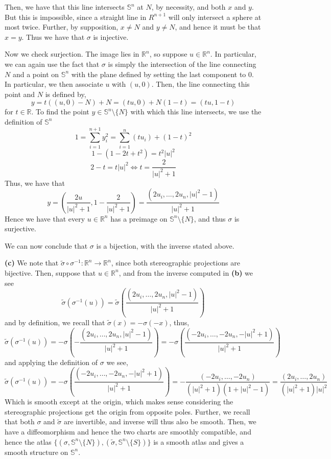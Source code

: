 \documentclass[10pt]{article}
\newcommand{\R}{\mathbb{R}}
\newcommand{\Sp}{\mathbb{S}}
\begin{document}
Then, we have that this line intersects $\Sp^{n}$ at $N$, by necessity, and both $x$ and $y$. But this is impossible, since a straight line in $R^{n+1}$ will only intersect a sphere at most twice. Further, by supposition, $x \neq N$ and $y \neq N$, and hence it must be that $x=y$. Thus we have that $\sigma$ is injective.

Now we check surjection. The image lies in $\R^{n}$, so suppose $u\in\R^{n}$. In particular, we can again use the fact that $\sigma$ is simply the intersection of the line connecting $N$ and a point on $\Sp^{n}$ with the plane defined by setting the last component to 0. In particular, we then associate $u$ with $(u,0)$. Then, the line connecting this point and $N$ is defined by,
$$y = t((u,0) - N) + N = (tu,0) + N(1-t) = (tu,1-t)$$
for $t\in\R$. To find the point $y\in \Sp^{n}\setminus \{N\}$ with which this line intersects, we use the definition of $\Sp^{n}$
$$1 = \sum_{i=1}^{n+1}y_{i}^{2} = \sum_{i=1}^{n}(tu_{i}) + (1-t)^{2}$$
$$1 - (1 -2t +t^{2}) = t^{2}|u|^{2}$$
$$2 - t = t|u|^{2} \iff t = \frac{2}{|u|^{2} +1}$$
Thus, we have that
$$y = \left(\frac{2u}{|u|^{2} + 1},1 - \frac{2}{|u|^{2} + 1}\right) = \frac{(2u_{i},\dots,2u_{n},|u|^{2}-1)}{|u|^{2} + 1}$$
Hence we have that every $u\in\R^{n}$ has a preimage on $\Sp^{n}\setminus \{N\}$, and thus $\sigma$ is surjective.

We can now conclude that $\sigma$ is a bijection, with the inverse stated above.

\textbf{(c)} We note that $\tilde{\sigma} \circ \sigma^{-1}: \R^{n} \to \R^{n}$, since both stereographic projections are bijective. Then, suppose that $u\in\R^{n}$, and from the inverse computed in \textbf{(b)} we see
$$\tilde{\sigma}(\sigma^{-1}(u)) = \tilde{\sigma}\left(\frac{(2u_{i},\dots,2u_{n},|u|^{2}-1)}{|u|^{2} + 1}\right)$$
and by definition, we recall that $\tilde{\sigma}(x) = -\sigma(-x)$, thus,
$$\tilde{\sigma}(\sigma^{-1}(u)) = -\sigma\left(-\frac{(2u_{i},\dots,2u_{n},|u|^{2}-1)}{|u|^{2} + 1}\right) = -\sigma\left(\frac{(-2u_{i},\dots,-2u_{n},-|u|^{2}+1)}{|u|^{2} + 1}\right)$$
and applying the definition of $\sigma$ we see,
$$\tilde{\sigma}(\sigma^{-1}(u)) = -\sigma\left(\frac{(-2u_{i},\dots,-2u_{n},-|u|^{2}+1)}{|u|^{2} + 1}\right) = -\frac{(-2u_{i},\dots,-2u_{n})}{(|u|^{2} + 1)(1 + |u|^{2} - 1)} = \frac{(2u_{i},\dots,2u_{n})}{(|u|^{2} + 1)|u|^{2}}$$
Which is smooth except at the origin, which makes sense considering the stereographic projections get the origin from opposite poles. Further, we recall that both $\sigma$ and $\tilde{\sigma}$ are invertible, and inverse will thus also be smooth. Then, we have a diffeomorphism and hence the two charts are smoothly compatible, and hence the atlas $\{(\sigma,\Sp^{n}\setminus \{N\}),(\tilde{\sigma},\Sp^{n}\setminus \{S\})\}$ is a smooth atlas and gives a smooth structure on $\Sp^{n}$.
\end{document}

